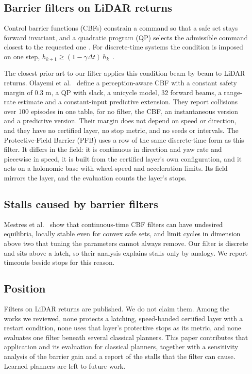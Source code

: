 \subsection{Barrier filters on LiDAR returns}

Control barrier functions (CBFs) constrain a command so that a safe set stays forward invariant, and a quadratic program (QP) selects the admissible command closest to the requested one \cite{ames2017cbfqp}. For discrete-time systems the condition is imposed on one step, $h_{k+1} \ge (1 - \gamma \Delta t)\,h_k$~\cite{yang2026cbfrl}.

The closest prior art to our filter applies this condition beam by beam to LiDAR returns. Olayemi et al.~\cite{olayemi2026} define a perception-aware CBF with a constant safety margin of 0.3 m, a QP with slack, a unicycle model, 32 forward beams, a range-rate estimate and a constant-input predictive extension. They report collisions over 100 episodes in one table, for no filter, the CBF, an instantaneous version and a predictive version. Their margin does not depend on speed or direction, and they have no certified layer, no stop metric, and no seeds or intervals. The Protective-Field Barrier (PFB) uses a row of the same discrete-time form as this filter. It differs in the field: it is continuous in direction and yaw rate and piecewise in speed, it is built from the certified layer's own configuration, and it acts on a holonomic base with wheel-speed and acceleration limits. Its field mirrors the layer, and the evaluation counts the layer's stops.

\subsection{Stalls caused by barrier filters}

Mestres et al.~\cite{mestres2026} show that continuous-time CBF filters can have undesired equilibria, locally stable even for convex safe sets, and limit cycles in dimension above two that tuning the parameters cannot always remove. Our filter is discrete and sits above a latch, so their analysis explains stalls only by analogy. We report timeouts beside stops for this reason.

\subsection{Position}

Filters on LiDAR returns are published. We do not claim them. Among the works we reviewed, none protects a latching, speed-banded certified layer with a restart condition, none uses that layer's protective stops as its metric, and none evaluates one filter beneath several classical planners. This paper contributes that application and its evaluation for classical planners, together with a sensitivity analysis of the barrier gain and a report of the stalls that the filter can cause. Learned planners are left to future work.
